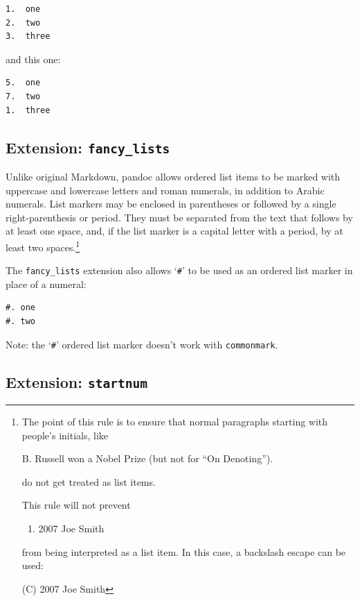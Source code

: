 \documentclass[
  b5paper
]{book}
\providecommand{\tightlist}{%
  \setlength{\itemsep}{0pt}\setlength{\parskip}{0pt}}
\begin{document}
\begin{verbatim}
1.  one
2.  two
3.  three
\end{verbatim}

and this one:

\begin{verbatim}
5.  one
7.  two
1.  three
\end{verbatim}

\subsection{\texorpdfstring{Extension:
\texttt{fancy\_lists}}{Extension: fancy\_lists}}\label{extension-fancy_lists}

Unlike original Markdown, pandoc allows ordered list items to be marked
with uppercase and lowercase letters and roman numerals, in addition to
Arabic numerals. List markers may be enclosed in parentheses or followed
by a single right-parenthesis or period. They must be separated from the
text that follows by at least one space, and, if the list marker is a
capital letter with a period, by at least two spaces.\footnote{The point
  of this rule is to ensure that normal paragraphs starting with
  people's initials, like

  B. Russell won a Nobel Prize (but not for ``On Denoting'').

  do not get treated as list items.

  This rule will not prevent

  \begin{enumerate}
  \def\labelenumi{(\Alph{enumi})}
  \setcounter{enumi}{2}
  \tightlist
  \item
    2007 Joe Smith
  \end{enumerate}

  from being interpreted as a list item. In this case, a backslash
  escape can be used:

  (C) 2007 Joe Smith}

The \texttt{fancy\_lists} extension also allows `\texttt{\#}' to be used
as an ordered list marker in place of a numeral:

\begin{verbatim}
#. one
#. two
\end{verbatim}

Note: the `\texttt{\#}' ordered list marker doesn't work with
\texttt{commonmark}.

\subsection{\texorpdfstring{Extension:
\texttt{startnum}}{Extension: startnum}}\label{extension-startnum}
\end{document}

